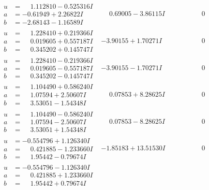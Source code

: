\documentclass[1p]{elsarticle_modified}
\theoremstyle{definition}
\begin{document}
$$\begin{array}{c|c|c}
\begin{aligned}
u &= \phantom{-}1.112810 - 0.525316 I \\
a &= -0.61949 + 2.26822 I \\
b &= -2.68143 - 1.16589 I\end{aligned}
 & \phantom{-}0.69005 - 3.86115 I & \phantom{-0.000000 } 0 \\ \hline\begin{aligned}
u &= \phantom{-}1.228410 + 0.219366 I \\
a &= \phantom{-}0.019605 + 0.557187 I \\
b &= \phantom{-}0.345202 + 0.145747 I\end{aligned}
 & -3.90155 + 1.70271 I & \phantom{-0.000000 } 0 \\ \hline\begin{aligned}
u &= \phantom{-}1.228410 - 0.219366 I \\
a &= \phantom{-}0.019605 - 0.557187 I \\
b &= \phantom{-}0.345202 - 0.145747 I\end{aligned}
 & -3.90155 - 1.70271 I & \phantom{-0.000000 } 0 \\ \hline\begin{aligned}
u &= \phantom{-}1.104490 + 0.586240 I \\
a &= \phantom{-}1.07594 + 2.50607 I \\
b &= \phantom{-}3.53051 - 1.54348 I\end{aligned}
 & \phantom{-}0.07853 + 8.28625 I & \phantom{-0.000000 } 0 \\ \hline\begin{aligned}
u &= \phantom{-}1.104490 - 0.586240 I \\
a &= \phantom{-}1.07594 - 2.50607 I \\
b &= \phantom{-}3.53051 + 1.54348 I\end{aligned}
 & \phantom{-}0.07853 - 8.28625 I & \phantom{-0.000000 } 0 \\ \hline\begin{aligned}
u &= -0.554796 + 1.126340 I \\
a &= \phantom{-}0.421885 - 1.233660 I \\
b &= \phantom{-}1.95442 - 0.79674 I\end{aligned}
 & -1.85183 + 13.51530 I & \phantom{-0.000000 } 0 \\ \hline\begin{aligned}
u &= -0.554796 - 1.126340 I \\
a &= \phantom{-}0.421885 + 1.233660 I \\
b &= \phantom{-}1.95442 + 0.79674 I\end{aligned}

\end{array}$$
\end{document}
